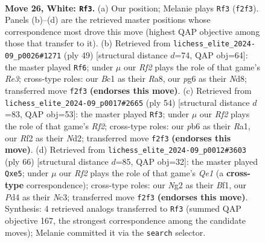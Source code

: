 \documentclass[11pt]{article}
\begin{document}
\clearpage

\begin{figure}[p]\centering
\begin{subfigure}{0.46\textwidth}\centering
\resizebox{\linewidth}{!}{%
\newchessgame
\chessboard[
  setfen={r6r/3nk2p/1pp1p1p1/8/1p1P3P/P3P1bq/RP3RN1/2BQ2K1 w - - 3 26},
  showmover=false,
  pgfstyle=straightmove, color=movearrow, markmove={f2-f3}
]}
\caption{}
\end{subfigure}\hfill
\begin{subfigure}{0.46\textwidth}\centering
\resizebox{\linewidth}{!}{%
\newchessgame
\chessboard[
  setfen={r2n1b1k/1p4q1/p2pr2p/2P1pQ2/4B3/P5P1/1P3P1P/3RR1K1 b - - 0 25},
  showmover=false,
  pgfstyle=straightmove, color=movearrow, markmove={e6-f6}
]}
\caption{}
\end{subfigure}
\\[4pt]
\begin{subfigure}{0.46\textwidth}\centering
\resizebox{\linewidth}{!}{%
\newchessgame
\chessboard[
  setfen={1r1q1rk1/7p/p5p1/3PpP2/1p1p4/1P1Pb1PP/P2NQR1K/R7 w - - 1 28},
  showmover=false,
  pgfstyle=straightmove, color=movearrow, markmove={f2-f3}
]}
\caption{}
\end{subfigure}\hfill
\begin{subfigure}{0.46\textwidth}\centering
\resizebox{\linewidth}{!}{%
\newchessgame
\chessboard[
  setfen={2b2rk1/6p1/3n3p/p1qPr3/P1p5/1pN4P/1P1R1PP1/4QBK1 w - - 0 34},
  showmover=false,
  pgfstyle=straightmove, color=movearrow, markmove={e1-e5}
]}
\caption{}
\end{subfigure}
\caption{\textbf{Move 26, White: \texttt{Rf3}.} (a) Our position; Melanie plays \texttt{Rf3} (\texttt{f2f3}). Panels (b)--(d) are the retrieved master positions whose correspondence most drove this move (highest QAP objective among those that transfer to it). (b) Retrieved from \texttt{lichess\_elite\_2024-09\_p0026\#1271} (ply 49) [structural distance $d$=74, QAP obj=64]: the master played \texttt{Rf6}; under $\mu$ our \emph{Rf2} plays the role of that game's \emph{Re3}; cross-type roles: our \emph{B}c1 as their \emph{R}a8, our \emph{p}g6 as their \emph{N}d8; transferred move \texttt{f2f3} \textbf{(endorses this move)}. (c) Retrieved from \texttt{lichess\_elite\_2024-09\_p0017\#2665} (ply 54) [structural distance $d$=83, QAP obj=53]: the master played \texttt{Rf3}; under $\mu$ our \emph{Rf2} plays the role of that game's \emph{Rf2}; cross-type roles: our \emph{p}b6 as their \emph{R}a1, our \emph{R}f2 as their \emph{N}d2; transferred move \texttt{f2f3} \textbf{(endorses this move)}. (d) Retrieved from \texttt{lichess\_elite\_2024-09\_p0012\#3603} (ply 66) [structural distance $d$=85, QAP obj=32]: the master played \texttt{Qxe5}; under $\mu$ our \emph{Rf2} plays the role of that game's \emph{Qe1} (a \textbf{cross-type} correspondence); cross-type roles: our \emph{N}g2 as their \emph{B}f1, our \emph{P}d4 as their \emph{N}c3; transferred move \texttt{f2f3} \textbf{(endorses this move)}. Synthesis: 4 retrieved analogs transferred to \texttt{Rf3} (summed QAP objective 167, the strongest correspondence among the candidate moves); Melanie committed it via the \texttt{search} selector.}
\label{fig:thought-m50}
\end{figure}
\end{document}
